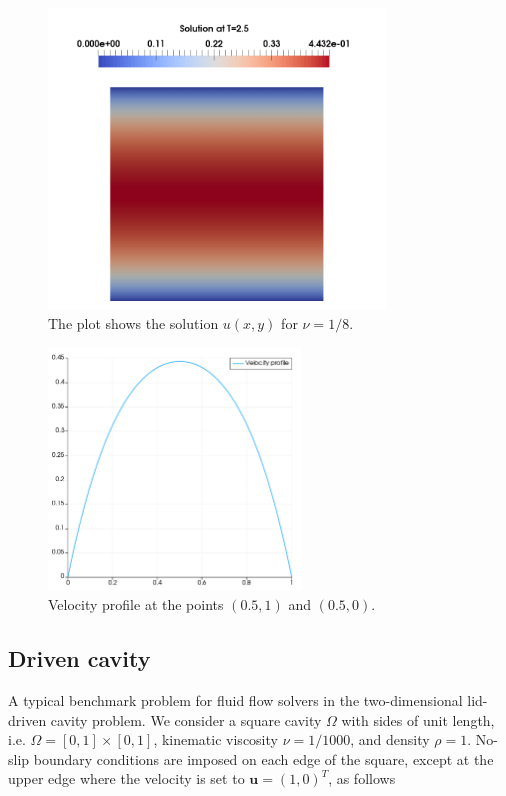 \documentclass[11pt,a4paper,titlepage]{report}
\begin{document}
\begin{figure}[h!]
\centering
\includegraphics[width=0.8\textwidth]{images/velocity_solution.png}
\caption{The plot shows the solution $u(x,y)$ for $\nu = 1/8$.}
\end{figure}

\begin{figure}[h!]
\centering
\includegraphics[width=0.6\textwidth]{images/velocity_profile.pdf}
\caption{Velocity profile at the points $(0.5, 1)$ and $(0.5, 0)$.}
\end{figure}

\subsection{Driven cavity}

A typical benchmark problem for fluid flow solvers in the two-dimensional lid-driven cavity problem. We consider a square cavity $\Omega$ with sides of unit length, i.e. $\Omega = [0,1] \times [0,1]$, kinematic viscosity $\nu = 1/1000$, and density $\rho = 1$. No-slip boundary conditions are imposed on each edge of the square, except at the upper edge where the velocity is set to $\mathbf{u} = (1,0)^T$, as follows
\end{document}
